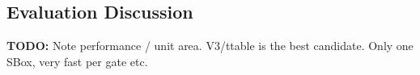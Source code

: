 
\subsection{Evaluation Discussion}
\label{sec:eval:results}

{\bf TODO:}
Note performance / unit area.
V3/ttable is the best candidate. Only one SBox, very fast per gate etc.
